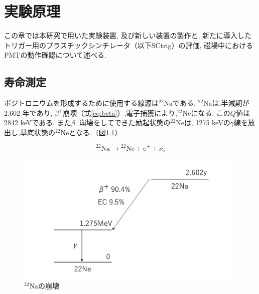 \chapter{実験原理}
\label{apparatus}


この章では本研究で用いた実験装置,
及び新しい装置の製作と,
新たに導入したトリガー用のプラスチックシンチレータ（以下SCtrig）の評価,
磁場中におけるPMTの動作確認について述べる.


\section{寿命測定}

ポジトロニウムを形成するために使用する線源は$\mathrm{^{22}Na}$である.
$\mathrm{^{22}Na}$は,半減期が2.602 年であり,
$\beta^{+}$崩壊（式\ref{eq:beta}）,電子捕獲により,$\mathrm{^{22}Ne}$になる.
この$Q$値は2842 keVである.\cite{ToRI}
また$\beta^{+}$崩壊をしてできた励起状態の$\mathrm{^{22}Ne}$は,
1275 keVの$\gamma$線を放出し,基底状態の$\mathrm{^{22}Ne}$となる.（図\ref{fig:na}）

\begin{equation}
\mathrm{^{22}Na} \to \mathrm{^{22}Ne} + \mathrm{e^{+}} + \nu_{\mathrm{e}}
\label{eq:beta}
\end{equation}

\begin{figure}[H]
\centering
\includegraphics[keepaspectratio,scale=0.4]{fig/ybm/na.pdf}
\caption{$\mathrm{^{22}Na}$の崩壊\cite{ToI}}
\label{fig:na}
\end{figure}

